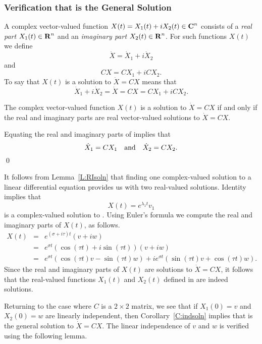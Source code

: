 \subsubsection*{Verification that \protect{} is the General Solution}

A complex vector-valued function $X(t)=X_1(t)+iX_2(t)\in\mbox{$\bf{C}$}^n$
 consists of
a {\em real part\/} $X_1(t)\in\mbox{$\bf{R}$}^n$ and an {\em imaginary part\/}
$X_2(t)\in\mbox{$\bf{R}$}^n$.  For such functions $X(t)$ we define
\[
\dot{X} = \dot{X}_1+i\dot{X}_2
\]
and
\[
CX = CX_1 + iCX_2.
\]
To say that $X(t)$ is a solution to $\dot{X}=CX$ means that
\begin{equation}  \label{E:X1X2}
\dot{X}_1+i\dot{X}_2 = \dot{X} = CX = CX_1 + iCX_2.
\end{equation}

\begin{lemma}  \label{L:RIsoln}
The complex vector-valued function $X(t)$ is a solution to $\dot{X}=CX$ if
and only if the real and imaginary parts are real vector-valued solutions
to $\dot{X}=CX$.
\end{lemma}

\proof Equating the real and imaginary parts of  implies that
\[
\dot{X}_1 = CX_1 \quad\mbox{and}\quad \dot{X}_2 = CX_2.
\]
\qed

It follows from Lemma~\ref{L:RIsoln} that finding one complex-valued solution
to a linear differential equation provides us with two real-valued solutions.
Identity  implies that
\[
X(t) = e^{\lambda_1 t}v_1
\]
is a complex-valued solution to .  Using Euler's formula we
compute the real and imaginary parts of $X(t)$, as follows.
\begin{eqnarray*}
X(t) & = & e^{(\sigma+i\tau)t}(v+iw) \\
& = & e^{\sigma t} (\cos(\tau t)+i\sin(\tau t))(v+iw)\\
& = & e^{\sigma t}(\cos(\tau t)v-\sin(\tau t)w)+
ie^{\sigma t}(\sin(\tau t)v+\cos(\tau t)w).
\end{eqnarray*}
Since the real and imaginary parts of $X(t)$ are solutions to $\dot{X}=CX$, it
follows that the real-valued functions $X_1(t)$ and $X_2(t)$ defined in
 are indeed solutions.

Returning to the case where $C$ is a $2\times 2$ matrix, we see that if
$X_1(0)=v$ and $X_2(0)=w$ are linearly independent, then
Corollary~\ref{C:indsoln} implies that  is the general solution to
$\dot{X}=CX$.  The linear independence of $v$ and $w$ is verified using the
following lemma.

